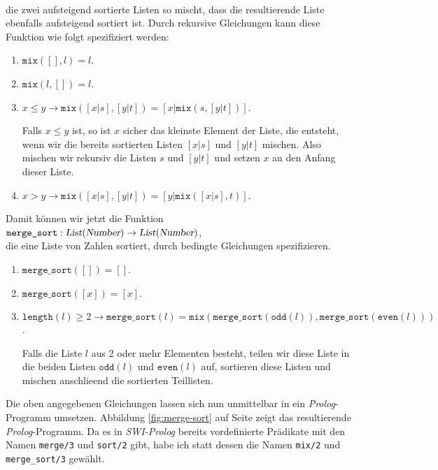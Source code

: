\\[0.2cm]
die zwei aufsteigend sortierte Listen so mischt,  dass die resultierende Liste ebenfalls
aufsteigend sortiert ist.  Durch rekursive Gleichungen kann diese Funktion wie folgt
spezifiziert werden: 
\begin{enumerate}
\item $\texttt{mix}([], l) = l$.
\item $\texttt{mix}(l, []) = l$.
\item $x \leq y \rightarrow \texttt{mix}([x|s], [y|t]) = [x|\texttt{mix}(s, [y|t])]$.

      Falls $x \leq y$ ist, so ist $x$ sicher das kleinste Element
      der Liste, die entsteht, wenn wir die bereits sortierten Listen $[x|s]$ und $[y|t]$ mischen.
      Also mischen wir rekursiv die Listen $s$ und $[y|t]$ und setzen $x$ an den Anfang
      dieser Liste.
\item $x  >   y \rightarrow \texttt{mix}([x|s], [y|t]) = [y|\texttt{mix}([x|s], t)]$.
\end{enumerate}
Damit k\"{o}nnen wir jetzt die Funktion\\[0.2cm]
\hspace*{1.3cm}  $\texttt{merge\_sort}: \textsl{List}(\textsl{Number}) \rightarrow \textsl{List}(\textsl{Number})$,
\\[0.2cm]
die eine Liste von Zahlen sortiert, durch bedingte Gleichungen spezifizieren.
\begin{enumerate}
\item $\texttt{merge\_sort}([]) = []$.
\item $\texttt{merge\_sort}([x]) = [x]$.
\item $\mathtt{length}(l) \geq 2 \rightarrow \texttt{merge\_sort}(l) = \texttt{mix}(
  \texttt{merge\_sort}(\texttt{odd}(l)),
  \texttt{merge\_sort}(\texttt{even}(l)))$.

      Falls die Liste $l$ aus 2 oder mehr Elementen besteht, teilen wir diese Liste
      in die beiden Listen $\mathtt{odd}(l)$ und $\mathtt{even}(l)$ auf, sortieren 
      diese Listen und mischen anschlie\3end die sortierten Teillisten.
\end{enumerate}
Die oben angegebenen Gleichungen lassen sich nun unmittelbar in ein
\textsl{Prolog}-Programm umsetzen.  Abbildung \ref{fig:merge-sort}
auf Seite \pageref{fig:merge-sort} zeigt das resultierende \textsl{Prolog}-Programm.
Da es in \textsl{SWI-Prolog} bereits vordefinierte Pr\"{a}dikate mit den Namen 
\texttt{merge/3} und \texttt{sort/2} gibt, habe ich statt dessen die Namen
\texttt{mix/2} und \texttt{merge\_sort/3} gew\"{a}hlt.


